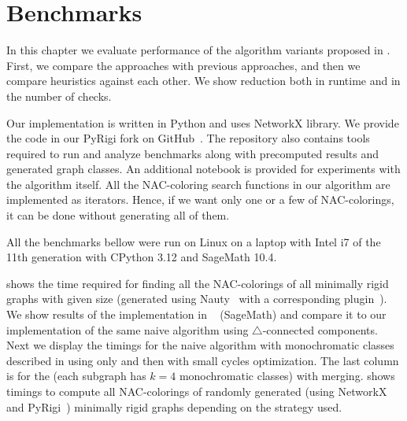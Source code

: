\chapter{Benchmarks}%
\label{chapter:benchmarks}

\begin{chapterabstract}

	In this chapter we evaluate performance of the algorithm
	variants proposed in .
	First, we compare the approaches with previous approaches,
	and then we compare heuristics against each other.
	We show reduction both in runtime and in the number
	of \IsNACColoring{} checks.

\end{chapterabstract}

Our implementation is written in Python and uses NetworkX library.
We provide the code in our PyRigi fork on GitHub~\cite{pyrigi_github_lastaapps}.
The repository also contains tools required to run and analyze benchmarks
along with precomputed results and generated graph classes.
An additional notebook is provided for experiments with the algorithm itself.
All the NAC-coloring search functions in our algorithm are implemented
as iterators. Hence, if we want only one or a few of NAC-colorings,
it can be done without generating all of them.

All the benchmarks bellow were run on Linux
on a laptop with Intel i7 of the 11th generation
with CPython 3.12 and SageMath 10.4.

 shows the time required for finding all the NAC-colorings
of all minimally rigid graphs with given size (generated using Nauty~\cite{nauty}
with a corresponding plugin~\cite{nauty_plugin}).
We show results of the implementation in \flexrilog{}~\cite{flexrilog_github} (SageMath)
and compare it to our implementation of the same naive algorithm using $\triangle$-connected components.
Next we display the timings for the naive algorithm with monochromatic classes
described in  using only \IsNACColoring{}
and then with small cycles optimization.
The last column is for the \NeighborsDegree{} (each subgraph has $k=4$ monochromatic classes)
with \MergeLinear{} merging.
 shows timings to compute all NAC-colorings of
randomly generated (using NetworkX~\cite{networkx} and
PyRigi~\cite{pyrigi}) minimally rigid graphs depending on the strategy used.


